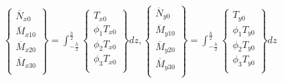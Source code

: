 \begin{equation}
\begin{matrix}
    \begin{Bmatrix}
            \overline{N}_{x0} \\
            \overline{M}_{x10} \\
            \overline{M}_{x20} \\
            \overline{M}_{x30} \\
    \end{Bmatrix} = 
    \displaystyle\int_{-\frac{h}{2}}^{\frac{h}{2}}
    \begin{Bmatrix}
            T_{x0} \\
            \phi_1 T_{x0} \\
            \phi_2 T_{x0} \\
            \phi_3 T_{x0} \\
    \end{Bmatrix}
    dz,
    \begin{Bmatrix}
            \overline{N}_{y0} \\
            \overline{M}_{y10} \\
            \overline{M}_{y20} \\
            \overline{M}_{y30} \\
    \end{Bmatrix} = 
    \displaystyle\int_{-\frac{h}{2}}^{\frac{h}{2}}
    \begin{Bmatrix}
            T_{y0} \\
            \phi_1 T_{y0} \\
            \phi_2 T_{y0} \\
            \phi_3 T_{y0} \\
    \end{Bmatrix}
    dz
\end{matrix}
\label{eq:bc_Bar_terms1}
\end{equation}

